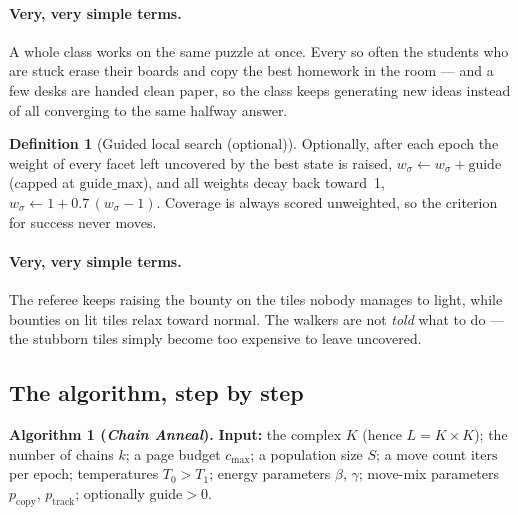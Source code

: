 \documentclass[11pt]{article}
\theoremstyle{definition}
\newtheorem{definition}{Definition}
\begin{document}
\paragraph{Very, very simple terms.}
A whole class works on the same puzzle at once. Every so often the students
who are stuck erase their boards and copy the best homework in the room ---
and a few desks are handed clean paper, so the class keeps generating new
ideas instead of all converging to the same halfway answer.

\begin{definition}[Guided local search (optional)]
\label{def:gls}
Optionally, after each epoch the weight of every facet left uncovered by the
best state is raised, $w_\sigma \leftarrow w_\sigma + \mathrm{guide}$
(capped at $\mathrm{guide\_max}$), and all weights decay back toward~1,
$w_\sigma \leftarrow 1 + 0.7\,(w_\sigma - 1)$. Coverage is always scored
unweighted, so the criterion for success never moves.
\end{definition}

\paragraph{Very, very simple terms.}
The referee keeps raising the bounty on the tiles nobody manages to light,
while bounties on lit tiles relax toward normal. The walkers are not
\emph{told} what to do --- the stubborn tiles simply become too expensive to
leave uncovered.

\subsection{The algorithm, step by step}

\noindent\textbf{Algorithm 1 (\emph{Chain Anneal}).}\;
\textbf{Input:} the complex $K$ (hence $L = K\times K$); the number of
chains $k$; a page budget $c_{\max}$; a population size $S$; a move count
$\mathrm{iters}$ per epoch; temperatures $T_0 > T_1$; energy parameters
$\beta$, $\gamma$; move-mix parameters $p_{\mathrm{copy}}$, $p_{\mathrm{track}}$;
optionally $\mathrm{guide} > 0$.
\end{document}
